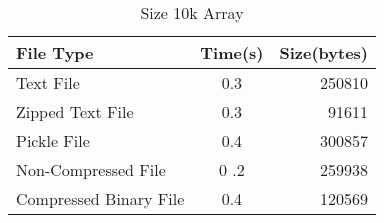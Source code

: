\begin{comment}
\begin{tikzpicture}
    \begin{axis}[
            title = {Compressed zipped text file formats speeds at various array sizes},
            xlabel = {number of elements},
            ylabel = {time (s)},
            xmin = 0, xmax = 400000,
            ymin = 0, ymax = 15,
            xtick = {0, 100000, 200000, 300000, 400000},
            ytick = {0, 5, 10, 15},
            ymajorgrids = true,
            grid style = dashed,
        ]

        \addplot[
            color = blue,
            mark = square,
        ]
        coordinates {
            (10000, .3)(109000, 3.1)(383000, 14.7)
        };
    \end{axis}
\end{tikzpicture}


\begin{tikzpicture}
    \begin{axis}[
            title = {Compressed binary file formats speeds at various array sizes},
            xlabel = {number of elements},
            ylabel = {time (s)},
            xmin = 0, xmax = 400000,
            ymin = 0, ymax = 15,
            xtick = {0, 100000, 200000, 300000, 400000},
            ytick = {0, 5, 10, 15},
            ymajorgrids = true,
            grid style = dashed,
        ]

        \addplot[
            color = blue,
            mark = square,
        ]
        coordinates {
            (10000, .5)(109000, 21.7)(383000, 14.7)
        };
    \end{axis}
\end{tikzpicture}


\end{comment}



\begin{table}[h!]
    \begin{center}
        \caption{Size 10k Array}
        \begin{tabular}{l|c|r}
            File Type & Time(s) & Size(bytes)\\
            \hline
            Text File & 0.3 & 250810\\
            \hline
            Zipped Text File & 0.3 & 91611\\
            \hline
            Pickle File &0.4 & 300857\\
            \hline
            Non-Compressed File &0 .2 & 259938\\
            \hline
            Compressed Binary File &0.4 & 120569\\   
        \end{tabular}
    \end{center}
\end{table}


